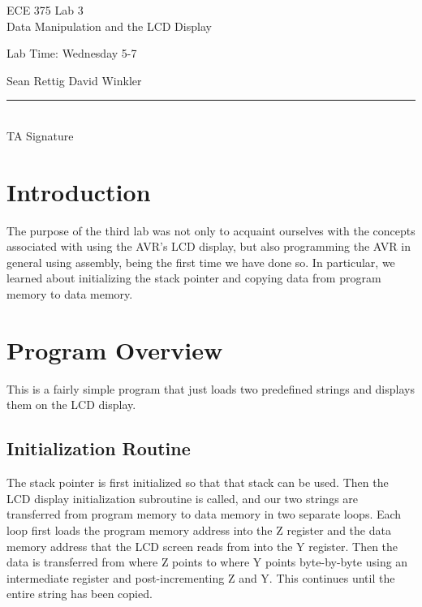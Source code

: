 \documentclass[12pt,letterpaper]{article}
\begin{document}
\begin{titlepage}
    \vspace*{4cm}
    \begin{flushright}
    {\huge
        ECE 375 Lab 3\\[1cm]
    }
    {\large
        Data Manipulation and the LCD Display
    }
    \end{flushright}
    \begin{flushleft}
    Lab Time: Wednesday 5-7
    \end{flushleft}
    \begin{flushright}
    Sean Rettig
    David Winkler
    \vfill
    \rule{5in}{.5mm}\\
    TA Signature
    \end{flushright}

\end{titlepage}

\section{Introduction}

The purpose of the third lab was not only to acquaint ourselves with the concepts associated with using the AVR's LCD display, but also programming the AVR in general using assembly, being the first time we have done so.  In particular, we learned about initializing the stack pointer and copying data from program memory to data memory.

\section{Program Overview}

This is a fairly simple program that just loads two predefined strings and displays them on the LCD display.

\subsection{Initialization Routine}

The stack pointer is first initialized so that that stack can be used.  Then the LCD display initialization subroutine is called, and our two strings are transferred from program memory to data memory in two separate loops.  Each loop first loads the program memory address into the Z register and the data memory address that the LCD screen reads from into the Y register.  Then the data is transferred from where Z points to where Y points byte-by-byte using an intermediate register and post-incrementing Z and Y.  This continues until the entire string has been copied.
\end{document}
